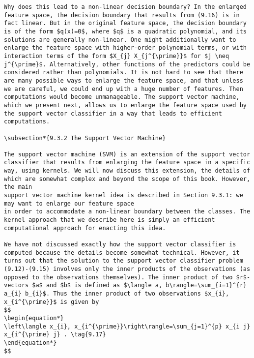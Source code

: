 \documentclass[10pt]{article}
\begin{document}
\begin{verbatim}
Why does this lead to a non-linear decision boundary? In the enlarged feature space, the decision boundary that results from (9.16) is in fact linear. But in the original feature space, the decision boundary is of the form $q(x)=0$, where $q$ is a quadratic polynomial, and its solutions are generally non-linear. One might additionally want to enlarge the feature space with higher-order polynomial terms, or with interaction terms of the form $X_{j} X_{j^{\prime}}$ for $j \neq j^{\prime}$. Alternatively, other functions of the predictors could be considered rather than polynomials. It is not hard to see that there are many possible ways to enlarge the feature space, and that unless we are careful, we could end up with a huge number of features. Then computations would become unmanageable. The support vector machine, which we present next, allows us to enlarge the feature space used by the support vector classifier in a way that leads to efficient computations.

\subsection*{9.3.2 The Support Vector Machine}

The support vector machine (SVM) is an extension of the support vector classifier that results from enlarging the feature space in a specific way, using kernels. We will now discuss this extension, the details of which are somewhat complex and beyond the scope of this book. However, the main
support vector machine kernel idea is described in Section 9.3.1: we may want to enlarge our feature space
in order to accommodate a non-linear boundary between the classes. The kernel approach that we describe here is simply an efficient computational approach for enacting this idea.

We have not discussed exactly how the support vector classifier is computed because the details become somewhat technical. However, it turns out that the solution to the support vector classifier problem (9.12)-(9.15) involves only the inner products of the observations (as opposed to the observations themselves). The inner product of two $r$-vectors $a$ and $b$ is defined as $\langle a, b\rangle=\sum_{i=1}^{r} a_{i} b_{i}$. Thus the inner product of two observations $x_{i}, x_{i^{\prime}}$ is given by
$$
\begin{equation*}
\left\langle x_{i}, x_{i^{\prime}}\right\rangle=\sum_{j=1}^{p} x_{i j} x_{i^{\prime} j} . \tag{9.17}
\end{equation*}
$$


\end{verbatim}
\end{document}

